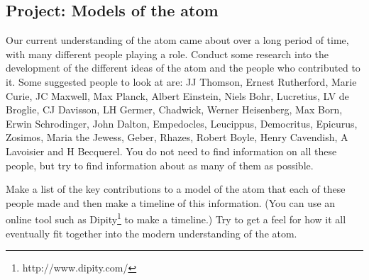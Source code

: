             \subsection{ Project: Models of the atom}
            \nopagebreak
            \label{m38756*eip-3}
Our current understanding of the atom came about over a long period of time, with many different people playing a role. Conduct some research into the development of the different ideas of the atom and the people who contributed to it. Some suggested people to look at are: JJ Thomson, Ernest Rutherford, Marie Curie, JC Maxwell, Max Planck, Albert Einstein, Niels Bohr, Lucretius, LV de Broglie, CJ Davisson, LH Germer, Chadwick, Werner Heisenberg, Max Born, Erwin Schrodinger, John Dalton, Empedocles, Leucippus, Democritus, Epicurus, Zosimos, Maria the Jewess, Geber, Rhazes, Robert Boyle, Henry Cavendish, A Lavoisier and H Becquerel. You do not need to find information on all these people, but try to find information about as many of them as possible.
\par 
\label{m38756*id7342}Make a list of the key contributions to a model of the atom that each of these people made and then make a timeline of this information. (You can use an online tool such as Dipity\footnote{http://www.dipity.com/}
         to make a timeline.) Try to get a feel for how it all eventually fit together into the modern understanding of the atom. 
\par \label{m38756*cid2}
